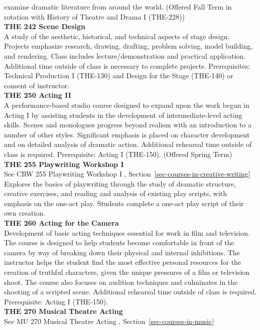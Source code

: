 \documentclass[
  letterpaper,
]{scrbook}
\begin{document}
examine dramatic literature from around the world. (Offered Fall Term in
rotation with History of Theatre and Drama I (THE-228))\\
\textbf{THE 242 Scene Design}\\
A study of the aesthetic, historical, and technical aspects of stage
design. Projects emphasize research, drawing, drafting, problem solving,
model building, and rendering. Class includes lecture/demonstration and
practical application. Additional time outside of class is necessary to
complete projects. Prerequisites: Technical Production I (THE-130) and
Design for the Stage (THE-140) or consent of instructor.\\
\textbf{THE 250 Acting II}\\
A performance-based studio course designed to expand upon the work begun
in Acting I by assisting students in the development of
intermediate-level acting skills. Scenes and monologues progress beyond
realism with an introduction to a number of other styles. Significant
emphasis is placed on character development and on detailed analysis of
dramatic action. Additional rehearsal time outside of class is required.
Prerequisite: Acting I (THE-150). (Offered Spring Term)\\
\textbf{THE 255 Playwriting Workshop I}\\
See CRW 255 Playwriting Workshop I ,
Section~\ref{sec-courses-in-creative-writing}\\
Explores the basics of playwriting through the study of dramatic
structure, creative exercises, and reading and analysis of existing play
scripts, with emphasis on the one-act play. Students complete a one-act
play script of their own creation.\\
\textbf{THE 260 Acting for the Camera}\\
Development of basic acting techniques essential for work in film and
television. The course is designed to help students become comfortable
in front of the camera by way of breaking down their physical and
internal inhibitions. The instructor helps the student find the most
effective personal resources for the creation of truthful characters,
given the unique pressures of a film or television shoot. The course
also focuses on audition techniques and culminates in the shooting of a
scripted scene. Additional rehearsal time outside of class is required.
Prerequisite: Acting I (THE-150).\\
\textbf{THE 270 Musical Theatre Acting}\\
See MU 270 Musical Theatre Acting , Section~\ref{sec-courses-in-music}\\
\end{document}
